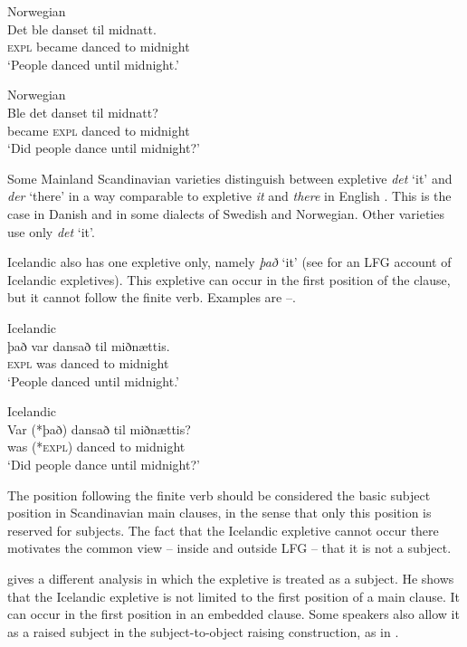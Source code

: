 \documentclass[output=paper,hidelinks]{langscibook}
\begin{document}
\ea\label{ex:Scandinavian:16} Norwegian\\
\gll
 {Det} {ble} {danset} {til} {midnatt.}\\
 \textsc{expl} became danced to midnight \\
\glt `People danced until midnight.'\z


\newpage
\ea\label{ex:Scandinavian:17} Norwegian\\
\gll
 {Ble} {det} {danset} {til} {midnatt?}\\
 became \textsc{expl} danced to midnight \\
\glt `Did people dance until midnight?'\z

\noindent Some Mainland Scandinavian varieties distinguish between expletive \textit{det} `it' and \textit{der} `there' in a way comparable to expletive \textit{it} and \textit{there} in English \citep{Larsson14}. This is the case in Danish and in some dialects of Swedish and Norwegian. Other varieties use only \textit{det} `it'.

 Icelandic also has one expletive only, namely \textit{það} `it' (see \citealt{Booth18} for an LFG account of Icelandic expletives). This expletive can occur in the first position of the clause, but it cannot follow the finite verb. Examples are --.



\ea\label{ex:Scandinavian:18} Icelandic \citep[310]{Thrainsson07}\\
\gll
 {það} {var} {dansað} {til} {miðnættis.}\\
 \textsc{expl} was danced to midnight \\
\glt `People danced until midnight.'\z


\ea\label{ex:Scandinavian:19} Icelandic \citep[312]{Thrainsson07}\\
\gll
 {Var} {(*það)} {dansað} {til} {miðnættis}\textsc{?}\\
 was (*\textsc{expl)} danced to midnight \\
\glt `Did people dance until midnight?'\z

\noindent The position following the finite verb should be considered the basic subject position in Scandinavian main clauses, in the sense that only this position is reserved for subjects. The fact that the Icelandic expletive cannot occur there motivates the common view -- inside and outside LFG -- that it is not a subject.

 \citet{Sells05} gives a different analysis in which the expletive is treated as a subject. He shows that the Icelandic expletive is not limited to the first position of a main clause. It can occur in the first position in an embedded clause. Some speakers also allow it as a raised subject in the subject-to-object raising construction, as in .
\end{document}
